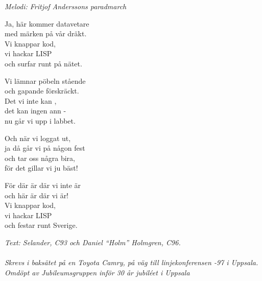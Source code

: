 {\footnotesize\textit{Melodi: Fritjof Anderssons paradmarch}}\par
\vspace{10pt}
Ja, här kommer datavetare\\
med märken på vår dräkt.\\
Vi knappar kod, \\
vi hackar LISP\\
och surfar runt på nätet.\par
\vspace{10pt}
Vi lämnar pöbeln stående\\
och gapande förskräckt.\\
Det vi inte kan , \\
det kan ingen ann -\\
nu går vi upp i labbet.\par
\vspace{10pt}
Och när vi loggat ut,\\
ja då går vi på någon fest\\
och tar oss några bira,\\
för det gillar vi ju bäst!\par
\vspace{10pt}
För där är där vi inte är\\
och här är där vi är!\\
Vi knappar kod,\\
vi hackar LISP\\
och festar runt Sverige.\par
\vspace{10pt}
{\footnotesize\textit{Text: Selander, C93 och Daniel ``Holm''
    Holmgren, C96.\\ \\ Skrevs i baksätet på en Toyota Camry, på väg
    till linjekonferensen -97 i Uppsala. Omdöpt av Jubileumsgruppen
    inför 30 år jubiléet i Uppsala}}
